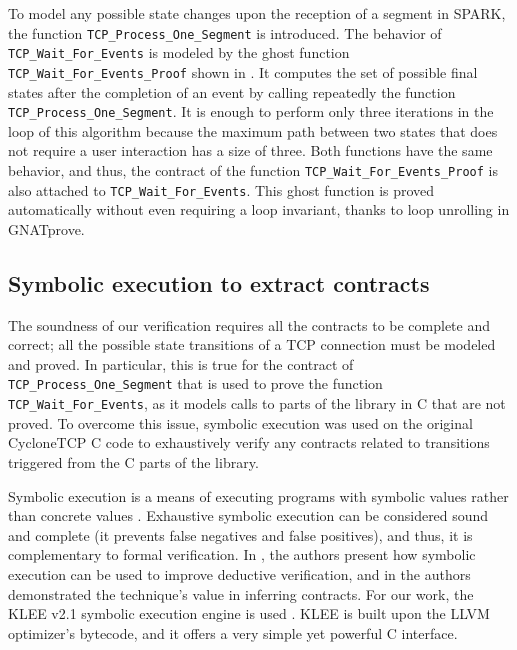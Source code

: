 \documentclass[conference]{IEEEtran}
\def\spark#1{\lstinline[language=Ada]{#1}}
\begin{document}
To model any possible state changes upon the reception of a segment in SPARK, the function \spark{TCP_Process_One_Segment} is introduced.
The behavior of \spark{TCP_Wait_For_Events} is modeled by the ghost function \spark{TCP_Wait_For_Events_Proof} shown in . It computes the set of possible final states after the completion of an event by calling repeatedly the function \spark{TCP_Process_One_Segment}. It is enough to perform only three iterations in the loop of this algorithm because the maximum path between two states that does not require a user interaction has a size of three. Both functions have the same behavior, and thus, the contract of the function \spark{TCP_Wait_For_Events_Proof} is also attached to \spark{TCP_Wait_For_Events}. This ghost function is proved automatically without even requiring a loop invariant, thanks to loop unrolling in GNATprove.


\subsection{Symbolic execution to extract contracts}

The soundness of our verification requires all the contracts to be complete and correct; all the possible state transitions of a TCP connection must be modeled and proved.  In particular, this is true for the contract of \spark{TCP_Process_One_Segment} that is used to prove the function \spark{TCP_Wait_For_Events}, as it models calls to parts of the library in C that are not proved. To overcome this issue, symbolic execution was used on the original CycloneTCP C code to exhaustively verify any contracts related to transitions triggered from the C parts of the library.

Symbolic execution is a means of executing programs with symbolic values rather than concrete values \cite{symbolic_exec_survey:2018}. Exhaustive symbolic execution can be considered sound and complete (it prevents false negatives and false positives), and thus, it is complementary to formal verification. In \cite{vanoverberghe2008using}, the authors present how symbolic execution can be used to improve deductive verification, and in \cite{kassios2012comparing} the authors demonstrated the technique's value in inferring contracts. For our work, the KLEE v2.1 symbolic execution engine is used \cite{KLEE}. KLEE is built upon the LLVM optimizer's bytecode, and it offers a very simple yet powerful C interface.
\end{document}

